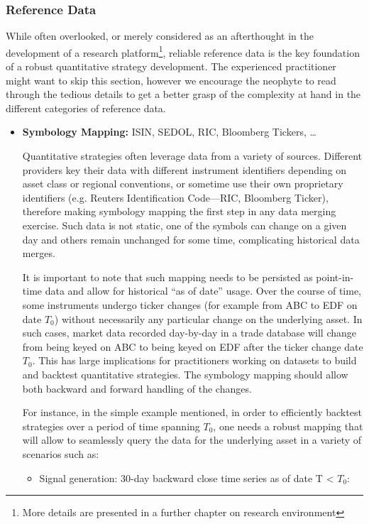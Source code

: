 \subsubsection{Reference Data} 
While often overlooked, or merely considered as an afterthought in the development of a research platform\footnote{More details are presented in a further chapter on research environment}, reliable reference data is the key foundation of a robust quantitative strategy development. The experienced practitioner might want to skip this section, however we encourage the neophyte to read through the tedious details to get a better grasp of the complexity at hand in the
different categories of reference data.

\begin{itemize}
\item \textbf{Symbology Mapping:} ISIN, SEDOL, RIC, Bloomberg Tickers, \dots

Quantitative strategies often leverage data from a variety of sources. Different providers key their data with different instrument identifiers depending on asset class or regional conventions, or sometime use their own proprietary identifiers (e.g. Reuters Identification Code---RIC, Bloomberg Ticker), therefore making symbology mapping the first step in any data merging exercise. Such data is not static, one of the symbols can change on a given day and others remain unchanged for some time, complicating historical data merges.


It is important to note that such mapping needs to be persisted as point-in-time data and allow for historical ``as of date'' usage. Over the course of time, some instruments undergo ticker changes (for example from ABC to EDF on date $T_0$) without necessarily any particular change on the underlying asset. In such cases, market data recorded day-by-day in a trade database will change from being keyed on ABC to being keyed on EDF after the ticker change date $T_0$. This has large implications for practitioners working on datasets to build and backtest quantitative strategies. The symbology mapping should allow both backward and forward handling of the changes.


For instance, in the simple example mentioned, in order to efficiently backtest strategies over a period of time spanning $T_0$, one needs a robust mapping that will allow to seamlessly query the data for the underlying asset in a variety of scenarios such as:
\begin{itemize}
\item Signal generation: 30-day backward close time series as of date T < $T_0$:


\end{itemize}
\end{itemize}
